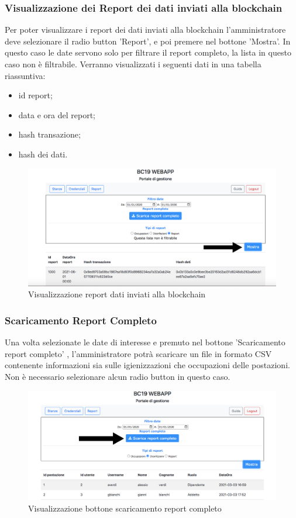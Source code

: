 \subsubsection{Visualizzazione dei Report dei dati inviati alla blockchain}
Per poter visualizzare i report dei dati inviati alla blockchain l'amministratore deve selezionare il radio button 'Report', e poi premere nel bottone 'Mostra'. In questo caso le date servono solo per filtrare il report completo, la lista in questo caso non è filtrabile.
Verranno visualizzati i seguenti dati in una tabella riassuntiva:
\begin{itemize}
\item id report;
\item data e ora del report;
\item hash transazione;
\item hash dei dati.
\end{itemize}
\begin{figure}[H]
	\centering
	\includegraphics[width=15cm]{res/images/bottoneReportR.png}
	\caption{Visualizzazione report dati inviati alla blockchain}
\end{figure}

\subsubsection{Scaricamento Report Completo}
Una volta selezionate le date di interesse e premuto nel bottone 'Scaricamento report completo' , l'amministratore potrà scaricare un file in formato CSV contenente informazioni sia sulle igienizzazioni che occupazioni delle postazioni.
Non è necessario selezionare alcun radio button in questo caso.
\begin{figure}[H]
	\centering
	\includegraphics[width=15cm]{res/images/ReportCompleto.png}
	\caption{Visualizzazione bottone scaricamento report completo}
\end{figure}

